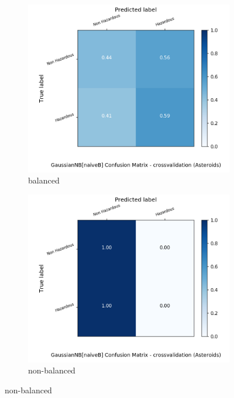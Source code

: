 \begin{figure}[H]
	\centering
	\begin{subfigure}{.5\textwidth}
		\centering
		\includegraphics[width=1.1\textwidth]{Plots/asteroids/asteroids_GaussianNB_naiveB_balance_True_crossvalidation.png}
		\caption{balanced}
	\end{subfigure}%
	\begin{subfigure}{.5\textwidth}
		\centering
		\includegraphics[width=1.1\textwidth]{Plots/asteroids/asteroids_GaussianNB_naiveB_balance_False_crossvalidation.png}
		\caption{non-balanced}
	\end{subfigure}
\end{figure}

